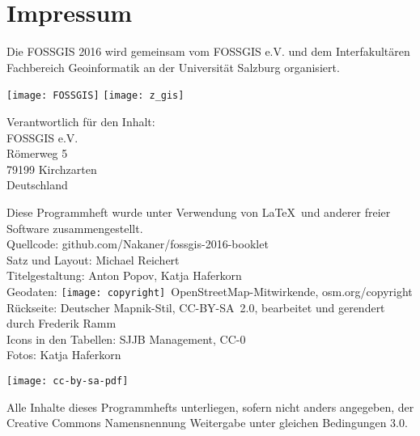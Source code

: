 \newpage
\section*{Impressum}
\label{impressum}


\RaggedRight
Die FOSSGIS 2016 wird gemeinsam vom FOSSGIS e.V. und dem Interfakultären Fachbereich Geoinformatik an der Universität Salzburg organisiert.

\vspace{0.5em}
	\texttt{[image: FOSSGIS]}
	\hfill
	\texttt{[image: z\_gis]}

\vspace{0.5em}
\noindent Verantwortlich für den Inhalt:\\
FOSSGIS e.V.\\
Römerweg 5\\
79199 Kirchzarten\\
Deutschland

\vspace{0.5em}
{\small\noindent Diese Programmheft wurde unter Verwendung von \LaTeX\ und 
anderer freier Software zusammengestellt.\\
 Quellcode: github.com/Nakaner/fossgis-2016-booklet\\
\noindent Satz und Layout: Michael Reichert\\
Titelgestaltung: Anton Popov, Katja Haferkorn\\
Geodaten: \texttt{[image: copyright]}~Open\-Street\-Map-Mitwirkende, osm.org/copyright\\
Rückseite: Deutscher Mapnik-Stil, CC-BY-SA~2.0, bearbeitet und gerendert durch Frederik Ramm\\
Icons in den Tabellen: SJJB Management, CC-0\\
Fotos: Katja Haferkorn\\
}

\vspace{1em}
\noindent \begin{minipage}[htbp]{0.2\textwidth}
\noindent\texttt{[image: cc-by-sa-pdf]}
\end{minipage}
\hfill
\begin{minipage}[hbtp]{0.74\textwidth}\RaggedRight
Alle Inhalte dieses Programmhefts unterliegen, sofern nicht anders angegeben, 
der Creative Commons Namensnennung Weitergabe unter gleichen Bedingungen 3.0.
\end{minipage}


